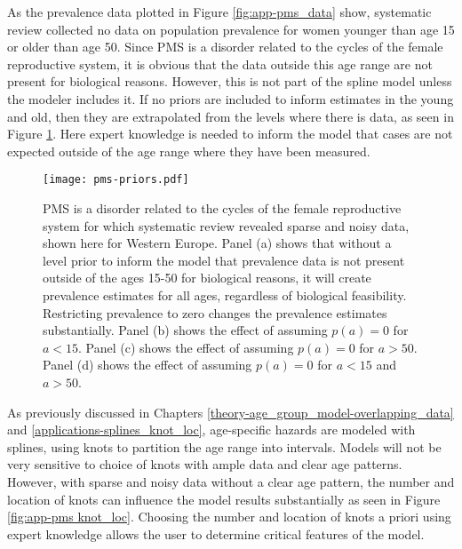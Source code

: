 As the prevalence data plotted in Figure \ref{fig:app-pms_data} show,
systematic review collected no data on population prevalence for women
younger than age 15 or older than age 50.  Since PMS is a disorder
related to the cycles of the female reproductive system, it is obvious
that the data outside this age range are not present for biological
reasons.  However, this is not part of the spline model unless the
modeler includes it.  If no priors are included to inform
estimates in the young and old, then they are extrapolated from the
levels where there is data, as seen in Figure
\ref{fig:app-pms prios_on_level}.  Here expert knowledge is needed to
inform the model that cases are not expected outside of the age range
where they have been measured.

    \begin{figure}
        \begin{center}
            \texttt{[image: pms-priors.pdf]}
        \end{center}
        \caption{PMS is a disorder related to the cycles of the female
          reproductive system for which systematic review revealed
          sparse and noisy data, shown here for Western Europe.  Panel
          (a) shows that without a level prior to inform the model
          that prevalence data is not present outside of the ages
          15-50 for biological reasons, it will create prevalence
          estimates for all ages, regardless of biological
          feasibility.  Restricting prevalence to zero changes the
          prevalence estimates substantially. Panel (b) shows the
          effect of assuming $p(a) = 0$ for $a<15$. Panel (c) shows
          the effect of assuming $p(a) = 0$ for $a>50$. Panel (d)
          shows the effect of assuming $p(a) = 0$ for $a<15$ and
          $a>50$.}
        \label{fig:app-pms prios_on_level}
    \end{figure}

As previously discussed in Chapters
\ref{theory-age_group_model-overlapping_data} and
\ref{applications-splines_knot_loc}, age-specific hazards are modeled
with splines, using knots to partition the age range into intervals.
Models will not be very sensitive to choice of knots with ample data
and clear age patterns.  However, with sparse and noisy data without a
clear age pattern, the number and location of knots can influence the
model results substantially as seen in Figure \ref{fig:app-pms knot_loc}.
Choosing the number and location of knots a priori using expert
knowledge allows the user to determine critical features of the model.

